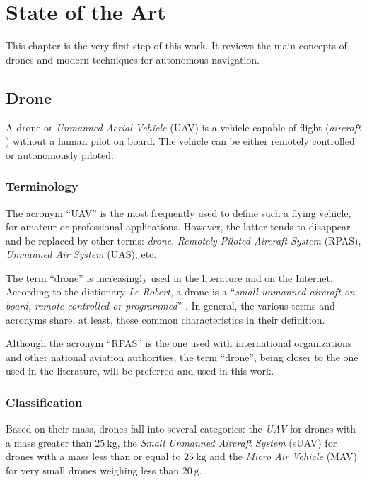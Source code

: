 \chapter{State of the Art}\label{ch:sota}

This chapter is the very first step of this work. It reviews the main concepts of drones and modern techniques for autonomous navigation.

\section{Drone}

A drone or \emph{Unmanned Aerial Vehicle} (UAV) \cite{wikipedia2021uav} is a vehicle capable of flight (\emph{aircraft} \cite{wikipedia2021aircraft}) without a human pilot on board. The vehicle can be either remotely controlled or autonomously piloted.

\subsection{Terminology}

The acronym \enquote{UAV} is the most frequently used to define such a flying vehicle, for amateur or professional applications. However, the latter tends to disappear and be replaced by other terms: \emph{drone}, \emph{Remotely Piloted Aircraft System} (RPAS), \emph{Unmanned Air System} (UAS), etc. \cite{altigator2021drones}

The term \enquote{drone} is increasingly used in the literature and on the Internet. According to the dictionary \emph{Le Robert}, a drone is a \enquote{\emph{small unmanned aircraft on board, remote controlled or programmed}} \cite{lerobert2021drone}. In general, the various terms and acronyms share, at least, these common characteristics in their definition.

Although the acronym \enquote{RPAS} is the one used with international organizations and other national aviation authorities, the term \enquote{drone}, being closer to the one used in the literature, will be preferred and used in this work.

\subsection{Classification}

Based on their mass, drones fall into several categories: the \emph{UAV} for drones with a mass greater than $\SI{25}{\kilo\gram}$, the \emph{Small Unmanned Aircraft System} (sUAV) for drones with a mass less than or equal to $\SI{25}{\kilo\gram}$ and the \emph{Micro Air Vehicle} (MAV) for very small drones weighing less than $\SI{20}{\gram}$. \cite{altigator2021drones}

